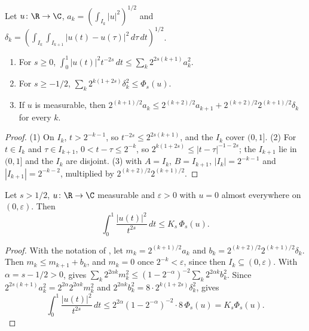 \begin{lemma}[{The interval $(0, 1]$ by dyadic blocks}]
\label{lem:half-line-blocks}
\leanok
{}
Let $u \colon \R \to \C$, $a_k = (\int_{I_k} |u|^2)^{1/2}$ and
$\delta_k = (\int_{I_k} \int_{I_{k+1}} |u(t) - u(\tau)|^2 \, d\tau \, dt)^{1/2}$.
\begin{enumerate}
  \item For $s \geq 0$, $\int_0^1 |u(t)|^2 t^{-2s} \, dt \leq \sum_k 2^{2s(k+1)} a_k^2$.
  \item For $s \geq -1/2$, $\sum_k 2^{k(1+2s)} \delta_k^2 \leq \Phi_s(u)$.
  \item If $u$ is measurable, then
  $2^{(k+1)/2} a_k \leq 2^{(k+2)/2} a_{k+1} + 2^{(k+2)/2} 2^{(k+1)/2} \delta_k$ for every $k$.
\end{enumerate}
\end{lemma}

\begin{proof}
\leanok
{}
(1) On $I_k$, $t > 2^{-k-1}$, so $t^{-2s} \leq 2^{2s(k+1)}$, and the $I_k$ cover $(0, 1]$.
(2) For $t \in I_k$ and $\tau \in I_{k+1}$, $0 < t - \tau \leq 2^{-k}$, so
$2^{k(1+2s)} \leq |t - \tau|^{-1-2s}$; the $I_{k+1}$ lie in $(0, 1]$ and the $I_k$ are disjoint.
(3)  with $A = I_k$, $B = I_{k+1}$, $|I_k| = 2^{-k-1}$ and
$|I_{k+1}| = 2^{-k-2}$, multiplied by $2^{(k+2)/2} 2^{(k+1)/2}$.
\end{proof}

\begin{lemma}[{A fractional Hardy inequality on $(0, 1]$}]
\label{lem:half-line-hardy}
\leanok
{}
Let $s > 1/2$, $u \colon \R \to \C$ measurable and $\varepsilon > 0$ with $u = 0$ almost
everywhere on $(0, \varepsilon)$. Then
\[
  \int_0^1 \frac{|u(t)|^2}{t^{2s}} \, dt \leq K_s \, \Phi_s(u) .
\]
\end{lemma}

\begin{proof}
\leanok
{}
With the notation of , let $m_k = 2^{(k+1)/2} a_k$ and
$b_k = 2^{(k+2)/2} 2^{(k+1)/2} \delta_k$. Then $m_k \leq m_{k+1} + b_k$, and $m_k = 0$ once
$2^{-k} < \varepsilon$, since then $I_k \subseteq (0, \varepsilon)$. With $\alpha = s - 1/2 > 0$,
 gives
$\sum_k 2^{2\alpha k} m_k^2 \leq (1 - 2^{-\alpha})^{-2} \sum_k 2^{2\alpha k} b_k^2$. Since
$2^{2s(k+1)} a_k^2 = 2^{2\alpha} 2^{2\alpha k} m_k^2$ and
$2^{2\alpha k} b_k^2 = 8 \cdot 2^{k(1+2s)} \delta_k^2$,  gives
\[
  \int_0^1 \frac{|u(t)|^2}{t^{2s}} \, dt \leq 2^{2\alpha} (1 - 2^{-\alpha})^{-2} \cdot 8 \,
  \Phi_s(u) = K_s \Phi_s(u) .
\]
\end{proof}


